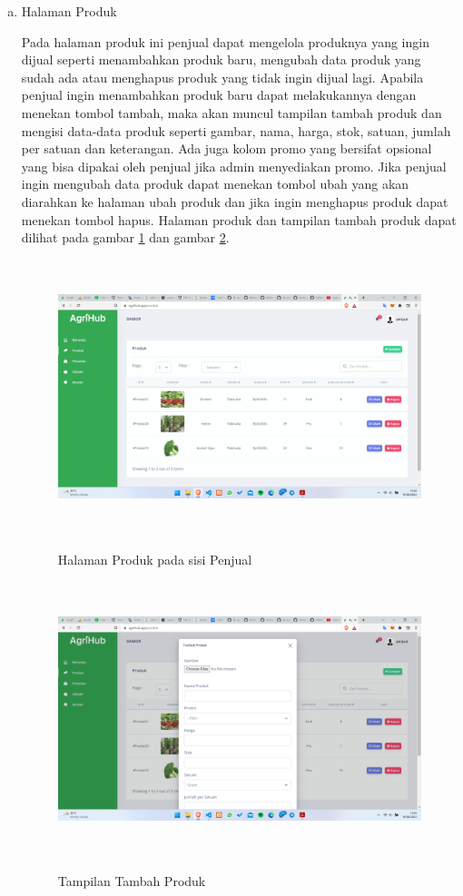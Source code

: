 \begin{enumerate}
\begin{enumerate}[a.]
		\item Halaman Produk
		\par Pada halaman produk ini penjual dapat mengelola produknya yang ingin dijual seperti menambahkan produk baru, mengubah data produk yang sudah ada atau menghapus produk yang tidak ingin dijual lagi. Apabila penjual ingin menambahkan produk baru dapat melakukannya dengan menekan tombol tambah, maka akan muncul tampilan tambah produk dan mengisi data-data produk seperti gambar, nama, harga, stok, satuan, jumlah per satuan dan keterangan. Ada juga kolom promo yang bersifat opsional yang bisa dipakai oleh penjual jika admin menyediakan promo. Jika penjual ingin mengubah data produk dapat menekan tombol ubah yang akan diarahkan ke halaman ubah produk dan jika ingin menghapus produk dapat menekan tombol hapus. Halaman produk dan tampilan tambah produk dapat dilihat pada gambar \ref*{produk_penjual} dan gambar \ref*{tambah_produk}.
		\begin{figure}[H]
			\centering
			{\includegraphics [width = 13.5cm, height= 8cm]{gambar/penjual/produk_penjual}}
			\caption{Halaman Produk pada sisi Penjual}
			\label{produk_penjual}
		\end{figure}
		\begin{figure}[H]
			\centering
			{\includegraphics [width = 13.5cm, height= 8cm]{gambar/penjual/tambah_produk}}
			\caption{Tampilan Tambah Produk}
			\label{tambah_produk}
		\end{figure}


\end{enumerate}
\end{enumerate}
